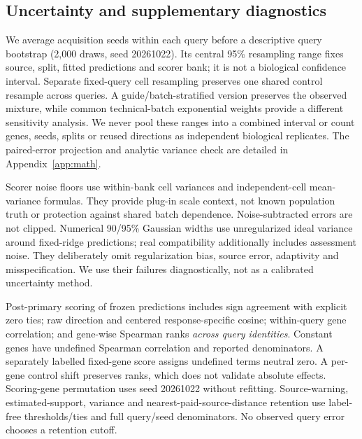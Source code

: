 \subsection{Uncertainty and supplementary diagnostics}
We average acquisition seeds within each query before a descriptive query bootstrap (2,000 draws, seed 20261022). Its central 95\% resampling range fixes source, split, fitted predictions and scorer bank; it is not a biological confidence interval. Separate fixed-query cell resampling preserves one shared control resample across queries. A guide/batch-stratified version preserves the observed mixture, while common technical-batch exponential weights provide a different sensitivity analysis. We never pool these ranges into a combined interval or count genes, seeds, splits or reused directions as independent biological replicates. The paired-error projection and analytic variance check are detailed in Appendix~\ref{app:math}.

Scorer noise floors use within-bank cell variances and independent-cell mean-variance formulas. They provide plug-in scale context, not known population truth or protection against shared batch dependence. Noise-subtracted errors are not clipped. Numerical 90/95\% Gaussian widths use unregularized ideal variance around fixed-ridge predictions; real compatibility additionally includes assessment noise. They deliberately omit regularization bias, source error, adaptivity and misspecification. We use their failures diagnostically, not as a calibrated uncertainty method.

Post-primary scoring of frozen predictions includes sign agreement with explicit zero ties; raw direction and centered response-specific cosine; within-query gene correlation; and gene-wise Spearman ranks \emph{across query identities}. Constant genes have undefined Spearman correlation and reported denominators. A separately labelled fixed-gene score assigns undefined terms neutral zero. A per-gene control shift preserves ranks, which does not validate absolute effects. Scoring-gene permutation uses seed 20261022 without refitting. Source-warning, estimated-support, variance and nearest-paid-source-distance retention use label-free thresholds/ties and full query/seed denominators. No observed query error chooses a retention cutoff.

